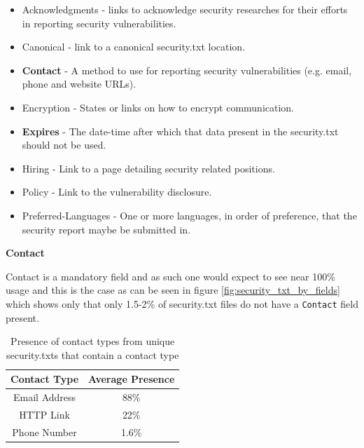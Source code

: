 \documentclass{mscreport}
\begin{document}
\begin{itemize}
	\setlength\itemsep{0.1em}
    \item Acknowledgments - links to acknowledge security researches for their efforts in reporting security vulnerabilities.
    \item Canonical - link to a canonical security.txt location.
    \item \textbf{Contact} - A method to use for reporting security vulnerabilities (e.g. email, phone and website URLs).
    \item Encryption - States or links on how to encrypt communication.
    \item \textbf{Expires} - The date-time after which that data present in the security.txt should not be used.
    \item Hiring - Link to a page detailing security related positions.
    \item Policy - Link to the vulnerability disclosure.
    \item Preferred-Languages - One or more languages, in order of preference, that the security report maybe be submitted in.
\end{itemize}

\vspace{0.7cm} \noindent
\textbf{Contact}

\noindent
Contact is a mandatory field and as such one would expect to see near 100\% usage and this is the case as can be seen in figure \ref{fig:security_txt_by_fields} which shows only that only 1.5-2\% of security.txt files do not have a \texttt{Contact} field present.

\begin{table}[H]
  \begin{center}
    \begin{tabular}{|c|c|}  %
      \hline
      \textbf{Contact Type} & \textbf{Average Presence}\\
      \hline
      Email Address & 88\%\\
      \hline
      HTTP Link & 22\%\\
      \hline
      Phone Number & 1.6\%\\
      \hline
    \end{tabular}
    \caption{Presence of contact types from unique security.txts that contain a contact type}
    \label{table:security_txt_by_contact_type} %
  \end{center}
\end{table}
\end{document}
